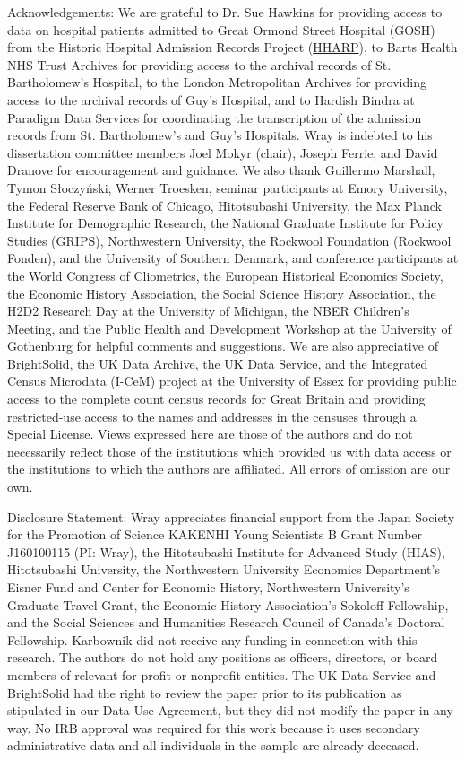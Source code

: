 \documentclass[12pt,english]{article}
\begin{document}
\begin{titlepage}
\begin{singlespace}
\noindent Acknowledgements: We are grateful to Dr. Sue Hawkins for providing access to data on hospital patients admitted to Great Ormond Street Hospital (GOSH) from the Historic Hospital Admission Records Project (\href{http://www.hharp.org}{HHARP}), to Barts Health NHS Trust Archives for providing access to the archival records of St. Bartholomew's Hospital, to the London Metropolitan Archives for providing access to the archival records of Guy's Hospital, and to Hardish Bindra at Paradigm Data Services for coordinating the transcription of the admission records from St. Bartholomew's and Guy's Hospitals. Wray is indebted to his dissertation committee members Joel Mokyr (chair), Joseph Ferrie, and David Dranove for encouragement and guidance. We also thank Guillermo Marshall, Tymon S{\l}oczy{\'n}ski, Werner Troesken, seminar participants at Emory University, the Federal Reserve Bank of Chicago, Hitotsubashi University, the Max Planck Institute for Demographic Research, the National Graduate Institute for Policy Studies (GRIPS), Northwestern University, the Rockwool Foundation (Rockwool Fonden), and the University of Southern Denmark, and conference participants at the World Congress of Cliometrics, the European Historical Economics Society, the Economic History Association, the Social Science History Association, the H2D2 Research Day at the University of Michigan, the NBER Children's Meeting, and the Public Health and Development Workshop at the University of Gothenburg for helpful comments and suggestions. We are also appreciative of BrightSolid, the UK Data Archive, the UK Data Service, and the Integrated Census Microdata (I-CeM) project at the University of Essex for providing public access to the complete count census records for Great Britain and providing restricted-use access to the names and addresses in the censuses through a Special License. Views expressed here are those of the authors and do not necessarily reflect those of the institutions which provided us with data access or the institutions to which the authors are affiliated. All errors of omission are our own.

\noindent Disclosure Statement: Wray appreciates financial support from the Japan Society for the Promotion of Science KAKENHI Young Scientists B Grant Number J160100115 (PI: Wray), the Hitotsubashi Institute for Advanced Study (HIAS), Hitotsubashi University, the Northwestern University Economics Department's Eisner Fund and Center for Economic History, Northwestern University's Graduate Travel Grant, the Economic History Association's Sokoloff Fellowship, and the Social Sciences and Humanities Research Council of Canada's Doctoral Fellowship. Karbownik did not receive any funding in connection with this research. The authors do not hold any positions as officers, directors, or board members of relevant for-profit or nonprofit entities. The UK Data Service and BrightSolid had the right to review the paper prior to its publication as stipulated in our Data Use Agreement, but they did not modify the paper in any way. No IRB approval was required for this work because it uses secondary administrative data and all individuals in the sample are already deceased. 


\end{singlespace}
\end{titlepage}
\end{document}
